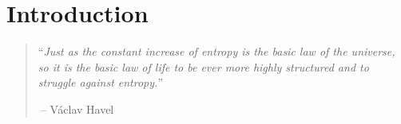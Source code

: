 \documentclass[../../book-main.tex]{subfiles}
\begin{document}
\chapter{Introduction}
\label{ch:intro}

\begin{quote}
``{\em Just as the constant increase of entropy is the basic law of the universe, so it is the basic law of life to be ever more highly structured and to struggle against entropy.}''

$~$\hfill -- V\'{a}clav Havel
 \end{quote}
\vspace{5mm}


\end{document}

